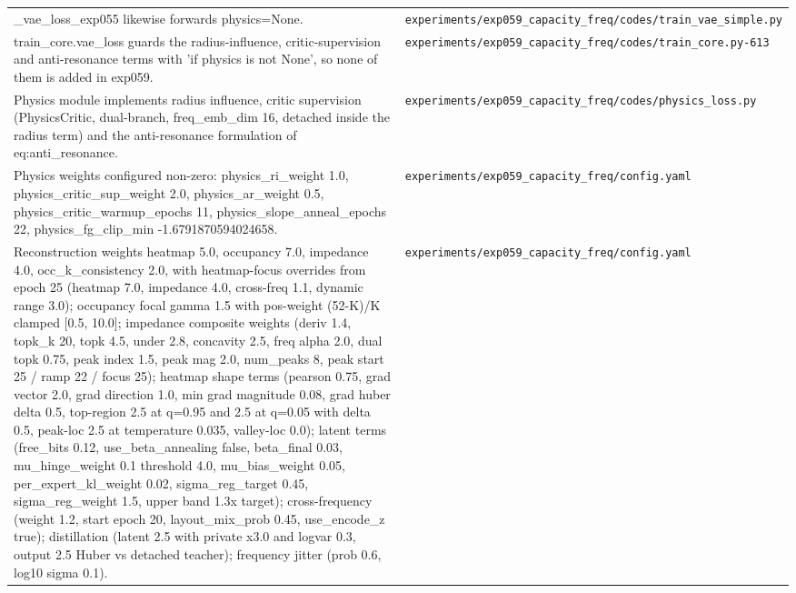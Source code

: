 \begin{longtable}{p{} p{}}
\_vae\_loss\_exp055 likewise forwards physics=None. & \texttt{experiments/\allowbreak{}exp059\_\allowbreak{}capacity\_\allowbreak{}freq/\allowbreak{}codes/\allowbreak{}train\_\allowbreak{}vae\_\allowbreak{}simple.py} \\
train\_core.vae\_loss guards the radius-influence, critic-supervision and anti-resonance terms with 'if physics is not None', so none of them is added in exp059. & \texttt{experiments/\allowbreak{}exp059\_\allowbreak{}capacity\_\allowbreak{}freq/\allowbreak{}codes/\allowbreak{}train\_\allowbreak{}core.py-613} \\
Physics module implements radius influence, critic supervision (PhysicsCritic, dual-branch, freq\_emb\_dim 16, detached inside the radius term) and the anti-resonance formulation of eq:anti\_resonance. & \texttt{experiments/\allowbreak{}exp059\_\allowbreak{}capacity\_\allowbreak{}freq/\allowbreak{}codes/\allowbreak{}physics\_\allowbreak{}loss.py} \\
Physics weights configured non-zero: physics\_ri\_weight 1.0, physics\_critic\_sup\_weight 2.0, physics\_ar\_weight 0.5, physics\_critic\_warmup\_epochs 11, physics\_slope\_anneal\_epochs 22, physics\_fg\_clip\_min -1.6791870594024658. & \texttt{experiments/\allowbreak{}exp059\_\allowbreak{}capacity\_\allowbreak{}freq/\allowbreak{}config.yaml} \\
Reconstruction weights heatmap 5.0, occupancy 7.0, impedance 4.0, occ\_k\_consistency 2.0, with heatmap-focus overrides from epoch 25 (heatmap 7.0, impedance 4.0, cross-freq 1.1, dynamic range 3.0); occupancy focal gamma 1.5 with pos-weight (52-K)/K clamped [0.5, 10.0]; impedance composite weights (deriv 1.4, topk\_k 20, topk 4.5, under 2.8, concavity 2.5, freq alpha 2.0, dual topk 0.75, peak index 1.5, peak mag 2.0, num\_peaks 8, peak start 25 / ramp 22 / focus 25); heatmap shape terms (pearson 0.75, grad vector 2.0, grad direction 1.0, min grad magnitude 0.08, grad huber delta 0.5, top-region 2.5 at q=0.95 and 2.5 at q=0.05 with delta 0.5, peak-loc 2.5 at temperature 0.035, valley-loc 0.0); latent terms (free\_bits 0.12, use\_beta\_annealing false, beta\_final 0.03, mu\_hinge\_weight 0.1 threshold 4.0, mu\_bias\_weight 0.05, per\_expert\_kl\_weight 0.02, sigma\_reg\_target 0.45, sigma\_reg\_weight 1.5, upper band 1.3x target); cross-frequency (weight 1.2, start epoch 20, layout\_mix\_prob 0.45, use\_encode\_z true); distillation (latent 2.5 with private x3.0 and logvar 0.3, output 2.5 Huber vs detached teacher); frequency jitter (prob 0.6, log10 sigma 0.1). & \texttt{experiments/\allowbreak{}exp059\_\allowbreak{}capacity\_\allowbreak{}freq/\allowbreak{}config.yaml} \\
\hline
\end{longtable}
\endgroup

